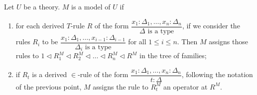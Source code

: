 \begin{definition}
    Let $U$ be a theory. $M$ is a model of $U$ if 
    \begin{enumerate}
        \item for each derived $T$-rule $R$ of the form 
            \(
                \dfrac{
                    x_1 : \Delta_1, \dots, x_n : \Delta_n
                }{
                    \Delta \text{ is a type}
                }
            \), if we consider the rules $R_i$ to be
            \( 
                \dfrac{
                    x_1 : \Delta_1, \dots, x_{i-1} : \Delta_{i-1}
                }{
                    \Delta_i \text{ is a type}
                }
            \) for all $1 \leq i \leq n$.
            Then $M$ assigns those rules to 
            $1 \vartriangleleft R_1^M \vartriangleleft R_2^M \vartriangleleft \dots \vartriangleleft R_n^M \vartriangleleft R^M$
            in the tree of families;
        \item if $R_t$ is a derived $\in$-rule of the form 
            \(
                \dfrac{
                    x_1 : \Delta_1, \dots, x_n : \Delta_n
                }{
                    t : \Delta 
                }
            \), following the notation of the previous point,
            $M$ assigns the rule to $R_t^M$ an operator at $R^M$.
    \end{enumerate}
\end{definition}

